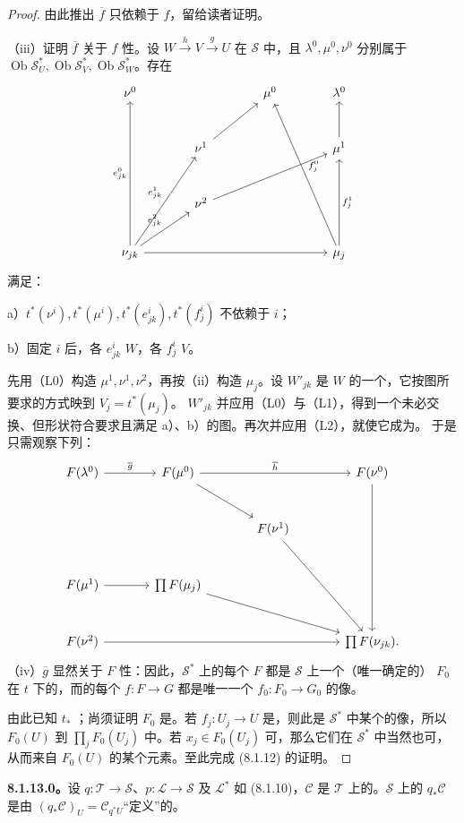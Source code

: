 \begin{proof}
由此推出 $\overline f$ 只依赖于 $f$，留给读者证明。

（iii）证明 $\overline f$ 关于 $f$ 性。设 $W\xrightarrow{h}V\xrightarrow{g}U$ 在 $\mathscr S$ 中，且 $\lambda^0,\mu^0,\nu^0$ 分别属于 $\operatorname{Ob}\mathscr S_U^*,\operatorname{Ob}\mathscr S_V^*,\operatorname{Ob}\mathscr S_W^*$。存在
\[\begin{tikzcd}[column sep=large,row sep=large]
\nu^0&&\mu^0&\lambda^0\\
&\nu^1\arrow[ur]&&\mu^1\arrow[u]\\
&\nu^2\arrow[urr]&&\\
\nu_{jk}\arrow[uuu,"e_{jk}^0"]\arrow[uur,"e_{jk}^1"]\arrow[ur,"e_{jk}^2"]&&&\mu_j\arrow[uuul,"f_j^0"']\arrow[uu,"f_j^1"']\arrow[from=lll]
\end{tikzcd}\]
满足：

a）$t^*(\nu^i),t^*(\mu^i),t^*(e_{jk}^i),t^*(f_j^i)$ 不依赖于 $i$；

b）固定 $i$ 后，各 $e_{jk}^i$  $W$，各 $f_j^i$  $V$。

先用（L0）构造 $\mu^1,\nu^1,\nu^2$，再按（ii）构造 $\mu_j$。设 $W'_{jk}$ 是 $W$ 的一个，它按图所要求的方式映到 $V_j=t^*(\mu_j)$。 $W'_{jk}$ 并应用（L0）与（L1），得到一个未必交换、但形状符合要求且满足 a）、b）的图。再次并应用（L2），就使它成为。
于是只需观察下列：
\[\begin{tikzcd}[column sep=large,row sep=large]
F(\lambda^0)\arrow[r,"\overline g"]&F(\mu^0)\arrow[rr,"\overline h"]\arrow[dr]&&F(\nu^0)\arrow[ddd]\\
&&F(\nu^1)\arrow[ddr]&\\
F(\mu^1)\arrow[r]&\prod F(\mu_j)\arrow[drr]&&\\
F(\nu^2)\arrow[rrr]&&&\prod F(\nu_{jk}).
\end{tikzcd}\]
（iv）$\overline g$ 显然关于 $F$ 性：因此，$\mathscr S^*$ 上的每个 $F$ 都是 $\mathscr S$ 上一个（唯一确定的） $F_0$ 在 $t$ 下的，而的每个 $f:F\to G$ 都是唯一一个 $f_0:F_0\to G_0$ 的像。

由此已知 $t_*$ ；尚须证明 $F_0$ 是。若 $f_j:U_j\to U$ 是，则此是 $\mathscr S^*$ 中某个的像，所以 $F_0(U)$ 到 $\prod_jF_0(U_j)$ 中。若 $x_j\in F_0(U_j)$ 可，那么它们在 $\mathscr S^*$ 中当然也可，从而来自 $F_0(U)$ 的某个元素。至此完成 (8.1.12) 的证明。
\end{proof}
\textbf{8.1.13.0。}设 $q:\mathscr T\to\mathscr S$、$p:\mathscr L\to\mathscr S$ 及 $\mathscr L^*$ 如 (8.1.10)，$\mathscr C$ 是 $\mathscr T$ 上的。$\mathscr S$ 上的 $q_*\mathscr C$ 是由 $(q_*\mathscr C)_U=\mathscr C_{q^*U}$“定义”的。


